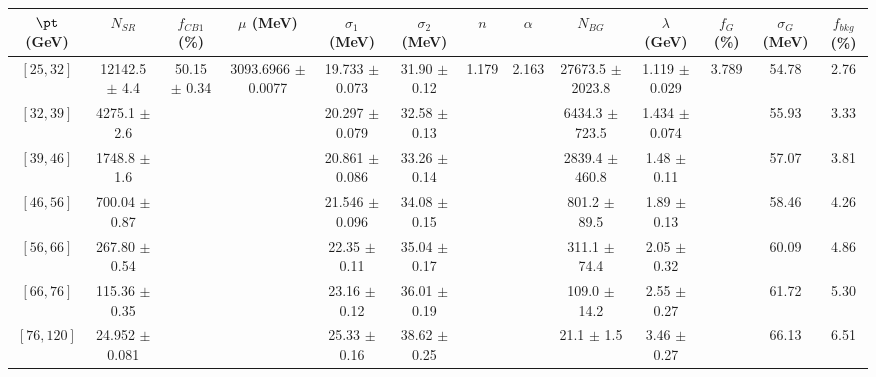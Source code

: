 \begin{tabular}{c||c|c|c|c|c|c|c|c|c|c|c||c}
$\pt$ (GeV) & $N_{SR}$ & $f_{CB1}$ (\%) & $\mu$ (MeV) & $\sigma_1$ (MeV) & $\sigma_2$ (MeV) & $n$ & $\alpha$ & $N_{BG}$ & $\lambda$ (GeV) & $f_G$ (\%) & $\sigma_G$ (MeV) & $f_{bkg}$ (\%) \\
\hline
$[25, 32]$ & 12142.5 $\pm$ 4.4 & \multirow{7}{*}{50.15 $\pm$ 0.34} & \multirow{7}{*}{3093.6966 $\pm$ 0.0077} & 19.733 $\pm$ 0.073 & 31.90 $\pm$ 0.12 & \multirow{7}{*}{1.179} & \multirow{7}{*}{2.163} & 27673.5 $\pm$ 2023.8 & 1.119 $\pm$ 0.029 & \multirow{7}{*}{3.789} & 54.78 & 2.76\\
$[32, 39]$ & 4275.1 $\pm$ 2.6 &  &  & 20.297 $\pm$ 0.079 & 32.58 $\pm$ 0.13 &  &  & 6434.3 $\pm$ 723.5 & 1.434 $\pm$ 0.074 &  & 55.93 & 3.33\\
$[39, 46]$ & 1748.8 $\pm$ 1.6 &  &  & 20.861 $\pm$ 0.086 & 33.26 $\pm$ 0.14 &  &  & 2839.4 $\pm$ 460.8 & 1.48 $\pm$ 0.11 &  & 57.07 & 3.81\\
$[46, 56]$ & 700.04 $\pm$ 0.87 &  &  & 21.546 $\pm$ 0.096 & 34.08 $\pm$ 0.15 &  &  & 801.2 $\pm$ 89.5 & 1.89 $\pm$ 0.13 &  & 58.46 & 4.26\\
$[56, 66]$ & 267.80 $\pm$ 0.54 &  &  & 22.35 $\pm$ 0.11 & 35.04 $\pm$ 0.17 &  &  & 311.1 $\pm$ 74.4 & 2.05 $\pm$ 0.32 &  & 60.09 & 4.86\\
$[66, 76]$ & 115.36 $\pm$ 0.35 &  &  & 23.16 $\pm$ 0.12 & 36.01 $\pm$ 0.19 &  &  & 109.0 $\pm$ 14.2 & 2.55 $\pm$ 0.27 &  & 61.72 & 5.30\\
$[76, 120]$ & 24.952 $\pm$ 0.081 &  &  & 25.33 $\pm$ 0.16 & 38.62 $\pm$ 0.25 &  &  & 21.1 $\pm$ 1.5 & 3.46 $\pm$ 0.27 &  & 66.13 & 6.51\\
\end{tabular}
